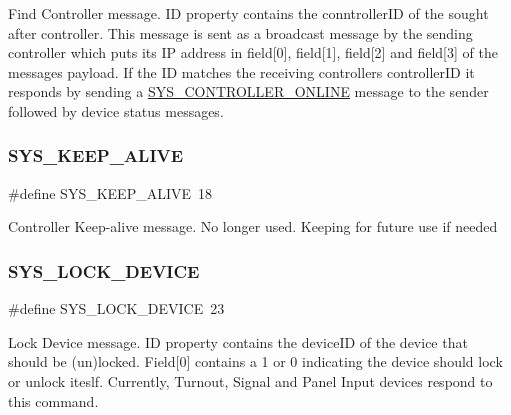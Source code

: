 Find Controller message. ID property contains the conntroller\+ID of the sought after controller. This message is sent as a broadcast message by the sending controller which puts its IP address in field\mbox{[}0\mbox{]}, field\mbox{[}1\mbox{]}, field\mbox{[}2\mbox{]} and field\mbox{[}3\mbox{]} of the message\textquotesingle{}s payload. If the ID matches the receiving controller\textquotesingle{}s controller\+ID it responds by sending a \hyperlink{group___u_d_p_message_i_d_ga23aab89076591390a1dbc412a3a07314}{S\+Y\+S\+\_\+\+C\+O\+N\+T\+R\+O\+L\+L\+E\+R\+\_\+\+O\+N\+L\+I\+NE} message to the sender followed by device status messages. \mbox{\label{group___u_d_p_message_i_d_ga596f44c285ab391c72addd0e803b0fc4}} 
\subsubsection{\texorpdfstring{S\+Y\+S\+\_\+\+K\+E\+E\+P\+\_\+\+A\+L\+I\+VE}{SYS\_KEEP\_ALIVE}}
{\footnotesize\ttfamily \#define S\+Y\+S\+\_\+\+K\+E\+E\+P\+\_\+\+A\+L\+I\+VE~18}

Controller Keep-\/alive message. No longer used. Keeping for future use if needed \mbox{\label{group___u_d_p_message_i_d_ga42644954a92421cfe92c2e3d20f795ce}} 
\subsubsection{\texorpdfstring{S\+Y\+S\+\_\+\+L\+O\+C\+K\+\_\+\+D\+E\+V\+I\+CE}{SYS\_LOCK\_DEVICE}}
{\footnotesize\ttfamily \#define S\+Y\+S\+\_\+\+L\+O\+C\+K\+\_\+\+D\+E\+V\+I\+CE~23}

Lock Device message. ID property contains the device\+ID of the device that should be (un)locked. Field\mbox{[}0\mbox{]} contains a 1 or 0 indicating the device should lock or unlock iteslf. Currently, Turnout, Signal and Panel Input devices respond to this command. \mbox{\label{group___u_d_p_message_i_d_ga9ba07526db57f9ec44d01fe3eba9cc60}} 
